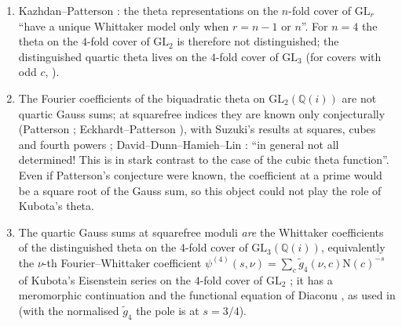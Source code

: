 \documentclass[11pt]{article}
\newcommand{\N}{\mathrm N}
\newcommand{\Q}{\mathbb Q}
\begin{document}
\begin{enumerate}
\item[(a)] [LIT] Kazhdan--Patterson \cite[Introduction and Thm.~II.2.5]{KP84}: the theta representations on the $n$-fold cover of $\mathrm{GL}_r$ ``have a unique Whittaker model only when $r=n-1$ or $n$''. For $n=4$ the theta on the $4$-fold cover of $\mathrm{GL}_2$ is therefore not distinguished; the distinguished quartic theta lives on the $4$-fold cover of $\mathrm{GL}_3$ (for covers with odd $c$, \cite[\S2]{FG14}).
\item[(b)] [LIT] The Fourier coefficients of the biquadratic theta on $\mathrm{GL}_2(\Q(i))$ are not quartic Gauss sums; at squarefree indices they are known only conjecturally (Patterson \cite{Pat84}; Eckhardt--Patterson \cite[Conj.~2.11]{EP92}), with Suzuki's results at squares, cubes and fourth powers \cite{Suz83}; David--Dunn--Hamieh--Lin \cite[\S1.2]{DDHL}: ``in general not all determined! This is in stark contrast to the case of the cubic theta function''. Even if Patterson's conjecture were known, the coefficient at a prime would be a square root of the Gauss sum, so this object could not play the role of Kubota's theta.
\item[(c)] [LIT] The quartic Gauss sums at squarefree moduli \emph{are} the Whittaker coefficients of the distinguished theta on the $4$-fold cover of $\mathrm{GL}_3(\Q(i))$, equivalently the $\nu$-th Fourier--Whittaker coefficient $\psi^{(4)}(s,\nu)=\sum_c\tilde g_4(\nu,c)\N(c)^{-s}$ of Kubota's Eisenstein series on the $4$-fold cover of $\mathrm{GL}_2$ \cite{KP84,CFH12,DDHL}; it has a meromorphic continuation and the functional equation of Diaconu \cite{Dia04}, as used in \cite[(4.28)]{DDHL} (with the normalised $\tilde g_4$ the pole is at $s=3/4$).

\end{enumerate}
\end{document}
